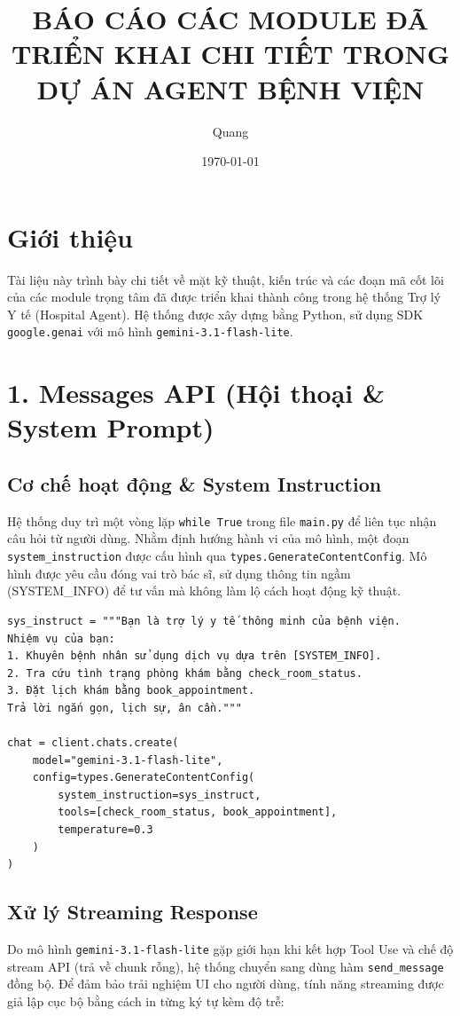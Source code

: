 \documentclass[12pt]{article}
\title{BÁO CÁO CÁC MODULE ĐÃ TRIỂN KHAI CHI TIẾT TRONG DỰ ÁN AGENT BỆNH VIỆN}
\author{Quang}
\date{\today}
\begin{document}
\maketitle

\section{Giới thiệu}
Tài liệu này trình bày chi tiết về mặt kỹ thuật, kiến trúc và các đoạn mã cốt lõi của các module trọng tâm đã được triển khai thành công trong hệ thống Trợ lý Y tế (Hospital Agent). Hệ thống được xây dựng bằng Python, sử dụng SDK \texttt{google.genai} với mô hình \texttt{gemini-3.1-flash-lite}.

\section{1. Messages API (Hội thoại \& System Prompt)}
\subsection{Cơ chế hoạt động \& System Instruction}
Hệ thống duy trì một vòng lặp \texttt{while True} trong file \texttt{main.py} để liên tục nhận câu hỏi từ người dùng. Nhằm định hướng hành vi của mô hình, một đoạn \texttt{system\_instruction} được cấu hình qua \texttt{types.GenerateContentConfig}. Mô hình được yêu cầu đóng vai trò bác sĩ, sử dụng thông tin ngầm (SYSTEM\_INFO) để tư vấn mà không làm lộ cách hoạt động kỹ thuật.

\begin{mdframed}[backgroundcolor=gray!10]
\begin{verbatim}
sys_instruct = """Bạn là trợ lý y tế thông minh của bệnh viện.
Nhiệm vụ của bạn:
1. Khuyên bệnh nhân sử dụng dịch vụ dựa trên [SYSTEM_INFO].
2. Tra cứu tình trạng phòng khám bằng check_room_status.
3. Đặt lịch khám bằng book_appointment.
Trả lời ngắn gọn, lịch sự, ân cần."""

chat = client.chats.create(
    model="gemini-3.1-flash-lite",
    config=types.GenerateContentConfig(
        system_instruction=sys_instruct,
        tools=[check_room_status, book_appointment],
        temperature=0.3
    )
)
\end{verbatim}
\end{mdframed}

\subsection{Xử lý Streaming Response}
Do mô hình \texttt{gemini-3.1-flash-lite} gặp giới hạn khi kết hợp Tool Use và chế độ stream API (trả về chunk rỗng), hệ thống chuyển sang dùng hàm \texttt{send\_message} đồng bộ. Để đảm bảo trải nghiệm UI cho người dùng, tính năng streaming được giả lập cục bộ bằng cách in từng ký tự kèm độ trễ:
\end{document}

